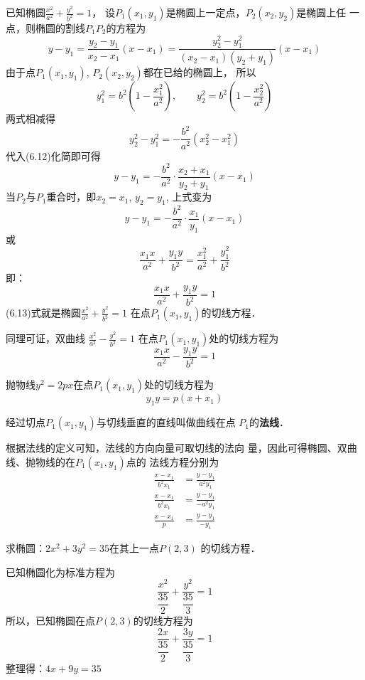 已知椭圆$\frac{x^2}{a^2}+\frac{y^2}{b^2}=1$，
设$P_1(x_1,y_1)$是椭圆上一定点，$P_2(x_2,y_2)$是椭圆上任
一点，则椭圆的割线$P_1P_2$的方程为
\begin{equation}
    y-y_1=\frac{y_2-y_1}{x_2-x_1}(x-x_1)=\frac{y^2_2-y^2_1}{(x_2-x_1)(y_2+y_1)}(x-x_1)
\end{equation}
由于点$P_1(x_1,y_1)$, $P_2(x_2,y_2)$都在已给的椭圆上，
所以
\[y^2_1=b^2\left(1-\frac{x^2_1}{a^2}\right),\qquad y^2_2=b^2\left(1-\frac{x^2_2}{a^2}\right)\]
两式相减得
\[y_2^2-y_1^2=-\frac{b^2}{a^2}(x^2_2-x^2_1)\]
代入(6.12)化简即可得
\[y-y_1=-\frac{b^2}{a^2}\cdot \frac{x_2+x_1}{y_2+y_1}(x-x_1)\]
当$P_2$与$P_1$重合时，即$x_2=x_1$, $y_2=y_1$, 上式变为
\[y-y_1=-\frac{b^2}{a^2}\cdot \frac{x_1}{y_1}(x-x_1)\]
或
\[\frac{x_1x}{a^2}+\frac{y_1y}{b^2}=\frac{x_1^2}{a^2}+\frac{y_1^2}{b^2}\]
即：
\begin{equation}
    \boxed{\frac{x_1x}{a^2}+\frac{y_1y}{b^2}=1}
\end{equation}
(6.13)式就是椭圆$\frac{x^2}{a^2}+\frac{y^2}{b^2}=1$
在点$P_1(x_1,y_1)$的切线方程．

同理可证，双曲线
$\frac{x^2}{a^2}-\frac{y^2}{b^2}=1$
在点$P_1(x_1,y_1)$处的切线方程为
\begin{equation}
    \boxed{\frac{x_1x}{a^2}-\frac{y_1y}{b^2}=1}
\end{equation}

抛物线$y^2=2px$在点$P_1(x_1,y_1)$处的切线方程为
\begin{equation}
    \boxed{y_1y=p(x+x_1)}
\end{equation}

经过切点$P_1(x_1,y_1)$与切线垂直的直线叫做曲线在点
$P_1$的\textbf{法线}．

根据法线的定义可知，法线的方向向量可取切线的法向
量，因此可得椭圆、双曲线、抛物线的在$P_1(x_1,y_1)$点的
法线方程分别为
\begin{align}
    \frac{x-x_1}{b^2x_1}&=\frac{y-y_1}{a^2y_1}\\
    \frac{x-x_1}{b^2x_1}&=\frac{y-y_1}{-a^2y_1}\\
    \frac{x-x_1}{p}&=\frac{y-y_1}{-y_1}
\end{align}


\begin{example}
    求椭圆：$2x^2+3y^2=35$在其上一点$P(2,3)$
的切线方程．
\end{example}

\begin{solution}
    已知椭圆化为标准方程为
\[\frac{x^2}{\dfrac{35}{2}}+\frac{y^2}{\dfrac{35}{3}}=1\]
所以，已知椭圆在点$P(2,3)$的切线方程为
\[\frac{2x}{\dfrac{35}{2}}+\frac{3y}{\dfrac{35}{3}}=1\]
整理得：$4x+9y=35$
\end{solution}

